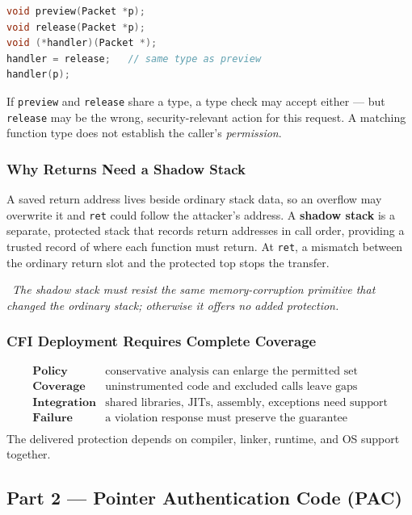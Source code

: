 \documentclass[hidelinks]{article}
\newcommand{\callout}[1]{\par\smallskip\noindent{\color{capri}$\blacktriangleright$}\ \textit{#1}\par\smallskip}
\begin{document}
\begin{lstlisting}[language=C]
void preview(Packet *p);
void release(Packet *p);
void (*handler)(Packet *);
handler = release;   // same type as preview
handler(p);
\end{lstlisting}
If \texttt{preview} and \texttt{release} share a type, a type check may accept either --- but \texttt{release} may be the wrong, security-relevant action for this request. A matching function type does not establish the caller's \emph{permission}.

\subsubsection{Why Returns Need a Shadow Stack}

A saved return address lives beside ordinary stack data, so an overflow may overwrite it and \texttt{ret} could follow the attacker's address. A \textbf{shadow stack} is a separate, protected stack that records return addresses in call order, providing a trusted record of where each function must return. At \texttt{ret}, a mismatch between the ordinary return slot and the protected top stops the transfer.

\callout{The shadow stack must resist the \emph{same} memory-corruption primitive that changed the ordinary stack; otherwise it offers no added protection.}

\subsubsection{CFI Deployment Requires Complete Coverage}

\[
\begin{array}{ll}
\textbf{Policy}      & \text{conservative analysis can enlarge the permitted set}\\
\textbf{Coverage}    & \text{uninstrumented code and excluded calls leave gaps}\\
\textbf{Integration} & \text{shared libraries, JITs, assembly, exceptions need support}\\
\textbf{Failure}     & \text{a violation response must preserve the guarantee}\\
\end{array}
\]
The delivered protection depends on compiler, linker, runtime, and OS support together.

\subsection{Part 2 --- Pointer Authentication Code (PAC)}
\end{document}
